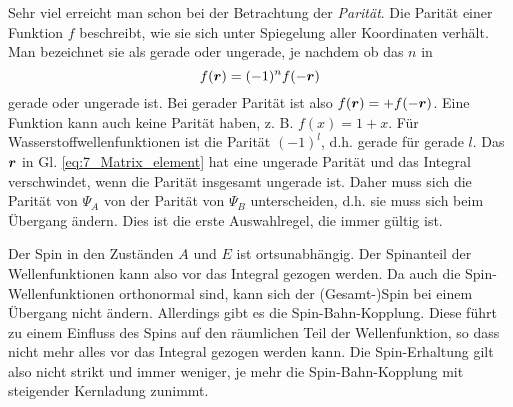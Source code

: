 Sehr viel erreicht man schon bei der Betrachtung der  \emph{Parität}. Die Parität einer Funktion $f$ beschreibt, wie sie sich unter Spiegelung aller Koordinaten verhält. Man bezeichnet sie als gerade oder ungerade, je nachdem ob das $n$ in 
\begin{equation}
    f(\boldsymbol{r}) = (-1)^n f(- \boldsymbol{r})
\end{equation}
gerade oder ungerade ist. Bei gerader Parität ist also $f(\boldsymbol{r}) = + f(- \boldsymbol{r}) $.
Eine Funktion kann auch keine Parität haben, z. B. $f(x) = 1 + x$. Für Wasserstoffwellenfunktionen ist die Parität $(-1)^l$, d.h. gerade für gerade $l$. Das $\boldsymbol{r}$ in Gl. \ref{eq:7_Matrix_element} hat eine ungerade Parität und das Integral verschwindet, wenn die Parität insgesamt ungerade ist. Daher muss sich die Parität von $\Psi_A$ von der Parität von $\Psi_B$ unterscheiden, d.h. sie muss sich beim Übergang ändern. Dies ist die erste Auswahlregel, die immer gültig ist.

Der Spin in den Zuständen $A$ und $E$ ist ortsunabhängig. Der Spinanteil der Wellenfunktionen kann also vor das Integral gezogen werden. Da auch die Spin-Wellenfunktionen orthonormal sind, kann sich der (Gesamt-)Spin bei einem Übergang nicht ändern. Allerdings gibt es die Spin-Bahn-Kopplung. Diese führt zu einem Einfluss des Spins auf den räumlichen Teil der Wellenfunktion, so dass nicht mehr alles vor das Integral gezogen werden kann. Die Spin-Erhaltung gilt also nicht strikt und immer weniger, je mehr die Spin-Bahn-Kopplung mit steigender Kernladung zunimmt.

\newpage

